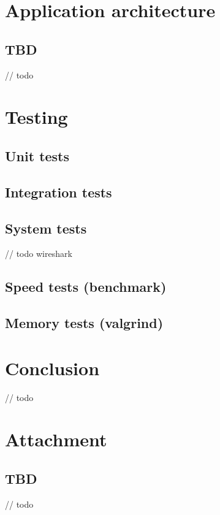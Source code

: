 \documentclass[a4paper, 11pt]{article}
\begin{document}
	\section{Application architecture}

	\subsection{TBD}
	// todo 

	\section{Testing}

	\subsection{Unit tests}
	\subsection{Integration tests}
	\subsection{System tests}
	// todo wireshark
	\subsection{Speed tests (benchmark)}
	\subsection{Memory tests (valgrind)}

	\section{Conclusion}
	// todo


	\clearpage
	\appendix

	\section{Attachment}

	\subsection{TBD}
	// todo
	\newpage
\end{document}
